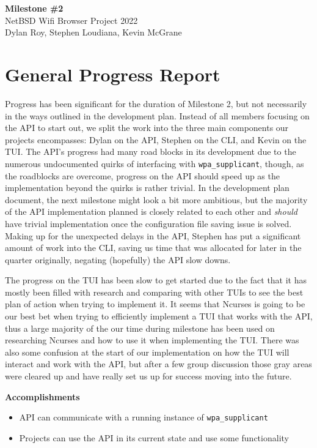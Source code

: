 \documentclass[11pt]{article}
\begin{document}
\begin{center}
  \textbf{\Large Milestone \#2}\\\large NetBSD Wifi Browser Project 2022\\
  Dylan Roy, Stephen Loudiana, Kevin McGrane
\end{center}


\section{General Progress Report}
Progress has been significant for the duration of Milestone 2, but not necessarily in the ways outlined
in the development plan. Instead of all members focusing on the API to start out, we split the work into
the three main components our projects encompasses: Dylan on the API, Stephen on the CLI, and Kevin on the TUI.
The API's progress had many road blocks in its development due to the numerous undocumented quirks of interfacing
with \texttt{wpa\_supplicant}, though, as the roadblocks are overcome, progress on the API should speed up
as the implementation beyond the quirks is rather trivial. In the development plan document, the next milestone
might look a bit more ambitious, but the majority of the API implementation planned is closely related to each
other and \textit{should} have trivial implementation once the configuration file saving issue is solved.
Making up for the unexpected delays in the API, Stephen has put a significant amount of work into the CLI, saving 
us time that was allocated for later in the quarter originally, negating (hopefully) the API slow downs.

The progress on the TUI has been slow to get started due to the fact that it has mostly been filled with research 
and comparing with other TUIs to see the best plan of action when trying to implement it. It seems that Ncurses 
is going to be our best bet when trying to efficiently implement a TUI that works with the API, thus a large majority 
of the our time during milestone has been used on researching Ncurses and how to use it when implementing the TUI. 
There was also some confusion at the start of our implementation on how the TUI will interact and work with the API, 
but after a few group discussion those gray areas were cleared up and have really set us up for success moving into 
the future.

\textbf{Accomplishments}
\begin{itemize}
  \item API can communicate with a running instance of \texttt{wpa\_supplicant}
  \item Projects can use the API in its current state and use some functionality
\end{itemize}
\end{document}
